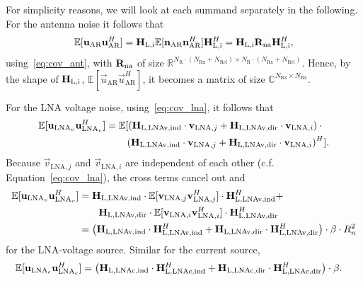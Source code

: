 For simplicity reasons, we will look at each summand separately in the following.
For the antenna noise it follows that
\begin{align}
\mathbb{E}[\mathbf{u}_\text{AR}\mathbf{u}_\text{AR}^H] = 
	\mathbf{H}_\text{L,i}\mathbb{E}[\mathbf{n}_\text{AR}\mathbf{n}_\text{AR}^H]\mathbf{H}_\text{L,i}^H 
	= \mathbf{H}_\text{L,i} \mathbf{R}_\text{na} \mathbf{H}_\text{L,i}^H,
\end{align}
using~\eqref{eq:cov_ant}, with $\mathbf{R}_\text{na}$ of size $\mathbb{R}^{ N_\text{R}\cdot\left(N_\text{Rx}+N_\text{Rel}\right)\times N_\text{R}\cdot\left(N_\text{Rx}+N_\text{Rel}\right)}$.
Hence, by the shape of $\mathbf{H}_\text{L,i}$, $\mathbb{E}[\vec{u}_\text{AR}\vec{u}_\text{AR}^H]$, it becomes a matrix of size $\mathbb{C}^{ N_\text{Rx}\times N_\text{Rx}}$.


For the LNA voltage noise, using~\eqref{eq:cov_lna}, it follows that
\begin{align}
\nonumber
\mathbb{E}[\mathbf{u}_{\text{LNA}_v}\mathbf{u}_{\text{LNA}_v}^H] &= 
\mathbb{E}[\left(\mathbf{H}_\text{L,LNAv,ind}\cdot\mathbf{v}_{\text{LNA},j}+\mathbf{H}_\text{L,LNAv,dir}\cdot\mathbf{v}_{\text{LNA},i}\right)\cdot\\
&\qquad\left(\mathbf{H}_\text{L,LNAv,ind}\cdot\mathbf{v}_{\text{LNA},j}+\mathbf{H}_\text{L,LNAv,dir}\cdot\mathbf{v}_{\text{LNA},i}\right)^H].
\end{align}
Because $\vec{v}_{\text{LNA},j}$ and $\vec{v}_{\text{LNA},i}$ are independent of each other (c.f. Equation~\eqref{eq:cov_lna}), the cross terms cancel out and
\begin{align}
\nonumber
\mathbb{E}[\mathbf{u}_{\text{LNA}_v}\mathbf{u}_{\text{LNA}_v}^H]&=
	\mathbf{H}_\text{L,LNAv,ind}\cdot
	\mathbb{E}[\mathbf{v}_{\text{LNA},j}\mathbf{v}_{\text{LNA},j}^H]\cdot
	\mathbf{H}_\text{L,LNAv,ind}^H+\\\nonumber
&\qquad \mathbf{H}_\text{L,LNAv,dir}\cdot
	\mathbb{E}[\mathbf{v}_{\text{LNA},i}\mathbf{v}_{\text{LNA},i}^H]\cdot
	\mathbf{H}_\text{L,LNAv,dir}^H\\
&=\left(\mathbf{H}_\text{L,LNAv,ind}\cdot\mathbf{H}_\text{L,LNAv,ind}^H+
	\mathbf{H}_\text{L,LNAv,dir}\cdot\mathbf{H}_\text{L,LNAv,dir}^H\right)\cdot \beta \cdot R_n^2
\end{align}
for the LNA-voltage source.
Similar for the current source,
\begin{align}
\mathbb{E}[\mathbf{u}_{\text{LNA}_c}\mathbf{u}_{\text{LNA}_c}^H]&= 
\left(\mathbf{H}_\text{L,LNAc,ind}\cdot\mathbf{H}_\text{L,LNAc,ind}^H+
	\mathbf{H}_\text{L,LNAc,dir}\cdot\mathbf{H}_\text{L,LNAc,dir}^H\right)\cdot \beta.
\end{align}

